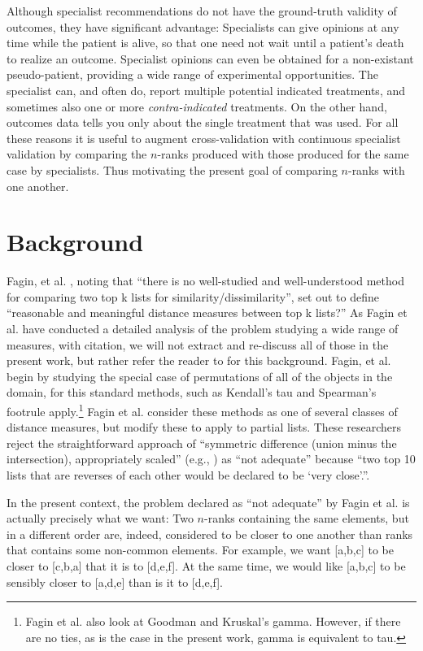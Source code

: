 \documentclass{article}
\begin{document}
Although specialist recommendations do not have the ground-truth validity of outcomes, they have significant advantage: Specialists can give opinions at any time while the patient is alive, so that one need not wait until a patient's death to realize an outcome. Specialist opinions can even be obtained for a non-existant pseudo-patient, providing a wide range of experimental opportunities. The specialist can, and often do, report multiple potential indicated treatments, and sometimes also one or more \emph{contra-indicated} treatments. On the other hand, outcomes data tells you only about the single treatment that was used. For all these reasons it is useful to augment cross-validation with continuous specialist validation by comparing the $n$-ranks produced with those produced for the same case by specialists. Thus motivating the present goal of comparing $n$-ranks with one another. 

\newpage
\section{Background}

Fagin, et al. \cite{fagin_comparing_2004}, noting that ``there is no well-studied and well-understood method for comparing two top k lists for similarity/dissimilarity'', set out to define ``reasonable and meaningful distance measures between top k lists?'' As Fagin et al. have conducted a detailed analysis of the problem studying a wide range of measures, with citation, we will not extract and re-discuss all of those in the present work, but rather refer the reader to \cite{fagin_comparing_2004} for this background. Fagin, et al. begin by studying the special case of permutations of all of the objects in the domain, for this standard methods, such as Kendall’s tau and Spearman’s footrule apply.\footnote{Fagin et al. also look at Goodman and Kruskal’s gamma. However, if there are no ties, as is the case in the present work, gamma is equivalent to tau.} Fagin et al. consider these methods as one of several classes of distance measures, but modify these to apply to partial lists. These researchers reject the straightforward approach of ``symmetric difference (union minus the intersection), appropriately scaled'' (e.g., \cite{lee_combining_1998}) as ``not adequate'' because ``two top 10 lists that are reverses of each other would be declared to be `very close'.''. 

In the present context, the problem declared as ``not adequate'' by Fagin et al. is actually precisely what we want: Two $n$-ranks containing the same elements, but in a different order are, indeed, considered to be closer to one another than ranks that contains some non-common elements. For example, we want [a,b,c] to be closer to [c,b,a] that it is to [d,e,f]. At the same time, we would like [a,b,c] to be sensibly closer to [a,d,e] than is it to [d,e,f].
\end{document}
